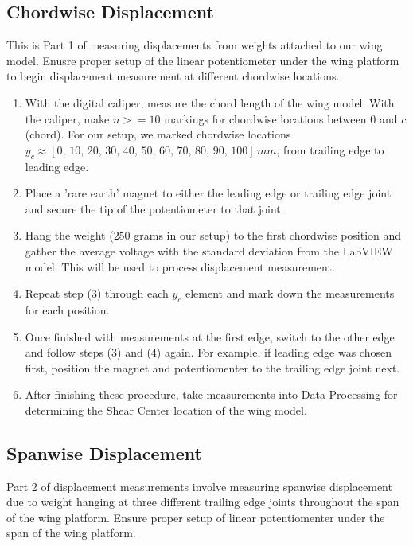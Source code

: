 \documentclass{article}
\begin{document}
\subsection{Chordwise Displacement}
This is Part 1 of measuring displacements from weights attached to our wing model. Enusre proper setup of the linear potentiometer under the wing platform to begin displacement measurement at different chordwise locations.
\begin{enumerate}
  \item With the digital caliper, measure the chord length of the wing model. With the caliper, make $n>=10$ markings for chordwise locations between $0$ and $c$ (chord). For our setup, we marked chordwise locations $y_{c} \approx \left[0,\, 10,\, 20,\, 30,\, 40,\, 50,\, 60,\, 70,\, 80,\, 90,\, 100\right]\, mm$, from trailing edge to leading edge.
  \vspace{2.5mm}
  
  \item Place a 'rare earth' magnet to either the leading edge or trailing edge joint and secure the tip of the potentiometer to that joint.
  \vspace{2.5mm}

  \item Hang the weight ($250$ grams in our setup) to the first chordwise position and gather the average voltage with the standard deviation from the LabVIEW model. This will be used to process displacement measurement.
  \vspace{2.5mm}

  \item Repeat step (3) through each $y_{c}$ element and mark down the measurements for each position.
  \vspace{2.5mm}

  \item Once finished with measurements at the first edge, switch to the other edge and follow steps (3) and (4) again. For example, if leading edge was chosen first, position the magnet and potentiomenter to the trailing edge joint next.
  \vspace{2.5mm}

  \item After finishing these procedure, take measurements into Data Processing for determining the Shear Center location of the wing model.
\end{enumerate}

  \subsection{Spanwise Displacement}
  Part 2 of displacement measurements involve measuring spanwise displacement due to weight hanging at three different trailing edge joints throughout the span of the wing platform. Ensure proper setup of linear potentiomenter under the span of the wing platform. 
  
\end{document}
